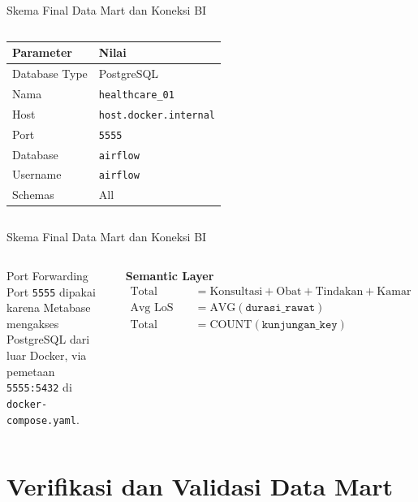 \documentclass[xcolor=table,t,aspectratio=169]{beamer}
\begin{document}
\begin{frame}{Skema Final Data Mart dan Koneksi BI}
\begin{columns}[T]
    \scriptsize
    \begin{tabular}{@{}ll@{}}
      \toprule
      \textbf{Parameter} & \textbf{Nilai} \\
      \midrule
      Database Type & PostgreSQL \\
      Nama          & \texttt{healthcare\_01} \\
      Host          & \texttt{host.docker.internal} \\
      Port          & \texttt{5555} \\
      Database      & \texttt{airflow} \\
      Username      & \texttt{airflow} \\
      Schemas       & All \\
      \bottomrule
    \end{tabular}
  \end{columns}
\end{frame}

\begin{frame}{Skema Final Data Mart dan Koneksi BI}
  \footnotesize
  \begin{columns}[T]
        \vspace{5pt}
    \begin{block}{Port Forwarding}
      \tiny Port \texttt{5555} dipakai karena Metabase mengakses PostgreSQL dari luar Docker, via pemetaan \texttt{5555:5432} di \texttt{docker-compose.yaml}.
    \end{block}
    \vspace{4pt}
    \textbf{Semantic Layer}
    \tiny
    \begin{align*}
      \text{Total Biaya}     &= \text{Konsultasi} + \text{Obat} + \text{Tindakan} + \text{Kamar} \\
      \text{Avg LoS}         &= \text{AVG}(\texttt{durasi\_rawat}) \\
      \text{Total Kunjungan} &= \text{COUNT}(\texttt{kunjungan\_key})
    \end{align*}
  \end{columns}
\end{frame}
\section{Verifikasi dan Validasi Data Mart}
\end{document}
